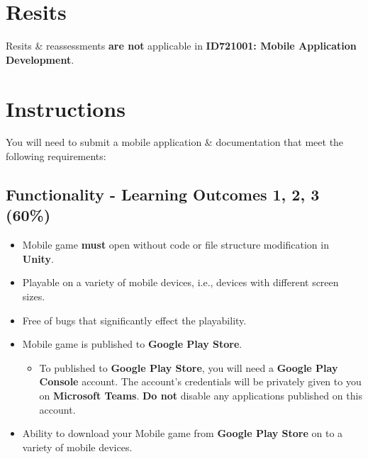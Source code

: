 \documentclass{article}
\begin{document}
\section*{Resits}
Resits \& reassessments \textbf{are not} applicable in \textbf{ID721001: Mobile Application Development}.

\section*{Instructions}
You will need to submit a mobile application \& documentation that meet the following requirements:

\subsection*{Functionality - Learning Outcomes 1, 2, 3 (60\%)}
\begin{itemize}
	\item Mobile game \textbf{must} open without code or file structure modification in \textbf{Unity}.
	\item Playable on a variety of mobile devices, i.e., devices with different screen sizes.
	\item Free of bugs that significantly effect the playability.
	\item Mobile game is published to \textbf{Google Play Store}.
	      \begin{itemize}
		      \item To published to \textbf{Google Play Store}, you will need a \textbf{Google Play Console} account. The account's credentials will be privately given to you on \textbf{Microsoft Teams}. \textbf{Do not} disable any applications published on this account.
	      \end{itemize}
	\item Ability to download your Mobile game from \textbf{Google Play Store} on to a variety of mobile devices.
\end{itemize}
\end{document}
